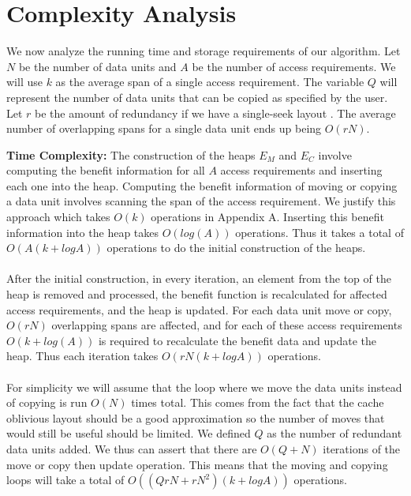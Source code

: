 \section{Complexity Analysis}

We now analyze the running time and storage requirements of our algorithm. Let $N$ be the number of data units and $A$ be the number of access requirements. We will use $k$ as the average span of a single access requirement. The variable $Q$ will represent the number of data units that can be copied as specified by the user. Let $r$ be the amount of redundancy if we have a single-seek layout \cite{singleseeklayout}. The average number of overlapping spans for a single data unit ends up being $O(rN)$. 

{\bf Time Complexity:} The construction of the heaps $E_M$ and $E_C$ involve computing the benefit information for all $A$ access requirements and inserting each one into the heap. Computing the benefit information of moving or copying a data unit involves scanning the span of the access requirement. We justify this approach which takes $O(k)$ operations in Appendix A. Inserting this benefit information into the heap takes $O(log (A))$ operations. Thus it takes a total of $O(A (k + logA))$ operations to do the initial construction of the heaps. \\
\\
After the initial construction, in every iteration, an element from the top of the heap is removed and processed, the benefit function is recalculated for affected access requirements, and the heap is updated. For each data unit move or copy, $O(rN)$ overlapping spans are affected, and for each of these access requirements $O(k+log(A))$ is required to recalculate the benefit data and update the heap. Thus each iteration takes $O(rN(k + logA))$ operations.\\
\\
For simplicity we will assume that the loop where we move the data units instead of copying is run $O(N)$ times total. This comes from the fact that the cache oblivious layout \cite{cacheobliviouslayout} should be a good approximation so the number of moves that would still be useful should be limited. We defined $Q$ as the number of redundant data units added. We thus can assert that there are $O(Q + N)$ iterations of the move or copy then update operation. This means that the moving and copying loops will take a total of $O((QrN + rN^2)(k + logA))$ operations. \\
\\
